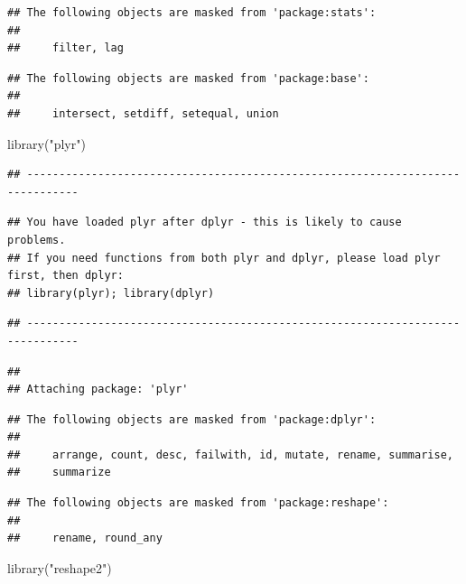 \documentclass[
]{book}
\newenvironment{Shaded}{\begin{snugshade}}{\end{snugshade}}
\newcommand{\FunctionTok}[1]{\textcolor[rgb]{0.00,0.00,0.00}{#1}}
\newcommand{\NormalTok}[1]{#1}
\newcommand{\StringTok}[1]{\textcolor[rgb]{0.31,0.60,0.02}{#1}}
\begin{document}
\begin{verbatim}
## The following objects are masked from 'package:stats':
## 
##     filter, lag
\end{verbatim}

\begin{verbatim}
## The following objects are masked from 'package:base':
## 
##     intersect, setdiff, setequal, union
\end{verbatim}

\begin{Shaded}
\begin{Highlighting}[]
\FunctionTok{library}\NormalTok{(}\StringTok{"plyr"}\NormalTok{)}
\end{Highlighting}
\end{Shaded}

\begin{verbatim}
## ------------------------------------------------------------------------------
\end{verbatim}

\begin{verbatim}
## You have loaded plyr after dplyr - this is likely to cause problems.
## If you need functions from both plyr and dplyr, please load plyr first, then dplyr:
## library(plyr); library(dplyr)
\end{verbatim}

\begin{verbatim}
## ------------------------------------------------------------------------------
\end{verbatim}

\begin{verbatim}
## 
## Attaching package: 'plyr'
\end{verbatim}

\begin{verbatim}
## The following objects are masked from 'package:dplyr':
## 
##     arrange, count, desc, failwith, id, mutate, rename, summarise,
##     summarize
\end{verbatim}

\begin{verbatim}
## The following objects are masked from 'package:reshape':
## 
##     rename, round_any
\end{verbatim}

\begin{Shaded}
\begin{Highlighting}[]
\FunctionTok{library}\NormalTok{(}\StringTok{"reshape2"}\NormalTok{)}
\end{Highlighting}
\end{Shaded}
\end{document}
